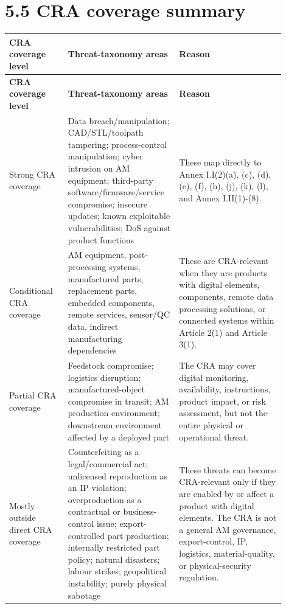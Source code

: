 \documentclass[10pt,a4paper,oneside]{report}
\begin{document}
\section{5.5 CRA coverage summary}


\begingroup
\scriptsize
\setlength{\tabcolsep}{4pt}
\begin{longtable}{@{}>{\RaggedRight\arraybackslash}p{0.20\linewidth}>{\RaggedRight\arraybackslash}p{0.34\linewidth}>{\RaggedRight\arraybackslash}p{0.36\linewidth}@{}}
\toprule
\textbf{CRA coverage level} & \textbf{Threat-taxonomy areas} & \textbf{Reason} \\
\midrule
\endfirsthead
\toprule
\textbf{CRA coverage level} & \textbf{Threat-taxonomy areas} & \textbf{Reason} \\
\midrule
\endhead
Strong CRA coverage & Data breach/manipulation; CAD/STL/toolpath tampering; process-control manipulation; cyber intrusion on AM equipment; third-party software/firmware/service compromise; insecure updates; known exploitable vulnerabilities; DoS against product functions & These map directly to Annex I.I(2)(a), (c), (d), (e), (f), (h), (j), (k), (l), and Annex I.II(1)-(8). \\
Conditional CRA coverage & AM equipment, post-processing systems, manufactured parts, replacement parts, embedded components, remote services, sensor/QC data, indirect manufacturing dependencies & These are CRA-relevant when they are products with digital elements, components, remote data processing solutions, or connected systems within Article 2(1) and Article 3(1). \\
Partial CRA coverage & Feedstock compromise; logistics disruption; manufactured-object compromise in transit; AM production environment; downstream environment affected by a deployed part & The CRA may cover digital monitoring, availability, instructions, product impact, or risk assessment, but not the entire physical or operational threat. \\
Mostly outside direct CRA coverage & Counterfeiting as a legal/commercial act; unlicensed reproduction as an IP violation; overproduction as a contractual or business-control issue; export-controlled part production; internally restricted part policy; natural disasters; labour strikes; geopolitical instability; purely physical sabotage & These threats can become CRA-relevant only if they are enabled by or affect a product with digital elements. The CRA is not a general AM governance, export-control, IP, logistics, material-quality, or physical-security regulation. \\
\bottomrule
\end{longtable}
\endgroup
\end{document}
